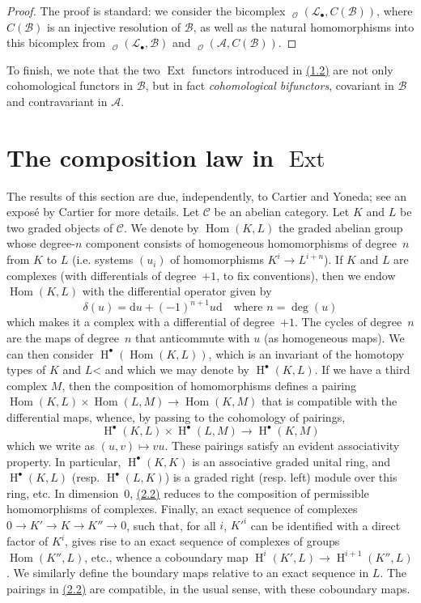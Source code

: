 \documentclass{article}
\newcommand{\scr}[1]{{\mathscr{#1}}}
\renewcommand{\cal}[1]{{\mathcal{#1}}}
\DeclareMathOperator{\Ext}{Ext}
\DeclareMathOperator{\Hom}{Hom}
\DeclareMathOperator{\shHom}{\underline{Hom}}
\DeclareMathOperator{\HH}{H}
\newcommand{\oldpage}[1]{\marginpar{\footnotesize$\Big\vert$ \textit{p.~#1}}}
\begin{document}
\begin{proof}
  The proof is standard: we consider the bicomplex $\shHom_\scr{O}(\scr{L}_\bullet,C(\scr{B}))$, where $C(\scr{B})$ is an injective resolution of $\scr{B}$, as well as the natural homomorphisms into this bicomplex from $\shHom_\scr{O}(\scr{L}_\bullet,\scr{B})$ and $\shHom_\scr{O}(\scr{A},C(\scr{B}))$.
\end{proof}

To finish, we note that the two $\Ext$ functors introduced in \hyperref[1.2]{(1.2)} are not only cohomological functors in $\scr{B}$, but in fact \emph{cohomological bifunctors}, covariant in $\scr{B}$ and contravariant in $\scr{A}$.


\section{The composition law in \texorpdfstring{$\Ext$}{Ext}}
\label{section2}

The results of this section are due, independently, to Cartier and Yoneda;
see an expos\'{e} by Cartier \cite{1} for more details.
Let $\cal{C}$ be an abelian category.
Let $K$ and $L$ be two graded objects of $\cal{C}$.
We denote by $\Hom(K,L)$ the graded abelian group whose degree-$n$ component consists of homogeneous homomorphisms of degree~$n$ from $K$ to $L$ (i.e. systems $(u_i)$ of homomorphisms $K^i\to L^{i+n}$).
If $K$ and $L$ are complexes (with differentials of degree~$+1$, to fix conventions), then we endow $\Hom(K,L)$ with the differential operator given by
\[
\label{2.1}
  \delta(u) = \mathrm{d}u + (-1)^{n+1}u\mathrm{d}
  \quad\text{where }n=\deg(u)
\tag{2.1}
\]
which makes it a complex with a differential of degree~$+1$.
The cycles of degree~$n$ are the maps of degree~$n$ that anticommute with $u$ (as homogeneous maps).
We can then consider $\HH^\bullet(\Hom(K,L))$, which is an invariant of the homotopy types of $K$ and $L$< and which we may denote by $\HH^\bullet(K,L)$.
If we have a third complex $M$, then the composition of homomorphisms defines a pairing $\Hom(K,L)\times\Hom(L,M)\to\Hom(K,M)$ that is compatible with the differential maps, whence, by passing to the cohomology of pairings,
\[
\label{2.2}
  \HH^\bullet(K,L)\times\HH^\bullet(L,M) \to \HH^\bullet(K,M)
\tag{2.2}
\]
which we write as $(u,v)\mapsto vu$.
These pairings satisfy an evident associativity property.
In particular, $\HH^\bullet(K,K)$ is an associative graded unital ring, and $\HH^\bullet(K,L)$ (resp. $\HH^\bullet(L,K)$) is a graded right (resp. left) module over this ring, etc.
In dimension~$0$, \hyperref[2.2]{(2.2)} reduces to the composition of permissible homomorphisms of complexes.
Finally, an exact sequence of complexes
\oldpage{149-04}
$0\to K'\to K\to K''\to0$, such that, for all $i$, $K'^i$ can be identified with a direct factor of $K^i$, gives rise to an exact sequence of complexes of groups $\Hom(K'',L)$, etc., whence a coboundary map $\HH^i(K',L)\to\HH^{i+1}(K'',L)$.
We similarly define the boundary maps relative to an exact sequence in $L$.
The pairings in \hyperref[2.2]{(2.2)} are compatible, in the usual sense, with these coboundary maps.
\end{document}
